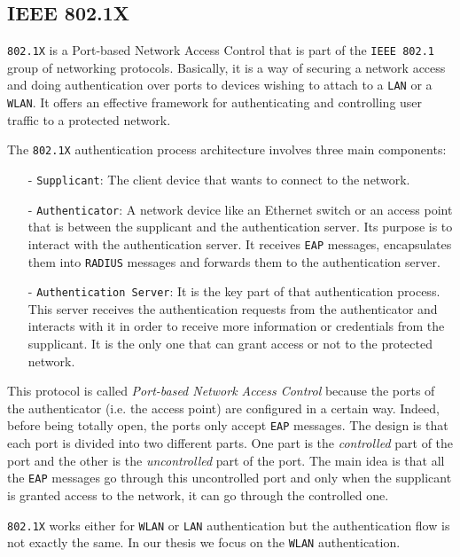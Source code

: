 \subsection{IEEE 802.1X}
\texttt{802.1X} is a Port-based Network Access Control that is part of the \texttt{IEEE 802.1} group of networking protocols. Basically, it is a way of securing a network access and doing authentication over ports to devices wishing to attach to a \texttt{LAN} or a \texttt{WLAN}. It offers an effective framework for authenticating and controlling user traffic to a protected network.

The \texttt{802.1X} authentication process architecture involves three main components:
\begin{itemize}
	\item[-]\texttt{Supplicant}: The client device that wants to connect to the network.
	\item[-]\texttt{Authenticator}: A network device like an Ethernet switch or an access point that is between the supplicant and the authentication server. Its purpose is to interact with the authentication server. It receives \texttt{EAP} messages, encapsulates them into \texttt{RADIUS} messages and forwards them to the authentication server.
	\item[-]\texttt{Authentication Server}: It is the key part of that authentication process. This server receives the authentication requests from the authenticator and interacts with it in order to receive more information or credentials from the supplicant. It is the only one that can grant access or not to the protected network.
\end{itemize} 

This protocol is called \textit{Port-based Network Access Control} because the ports of the authenticator (i.e. the access point) are configured in a certain way. Indeed, before being totally open, the ports only accept \texttt{EAP} messages. The design is that each port is divided into two different parts. One part is the \textit{controlled} part of the port and the other is the \textit{uncontrolled} part of the port. The main idea is that all the \texttt{EAP} messages go through this uncontrolled port and only when the supplicant is granted access to the network, it can go through the controlled one.

\texttt{802.1X} works either for \texttt{WLAN} or \texttt{LAN} authentication but the authentication flow is not exactly the same. In our thesis we focus on the \texttt{WLAN} authentication.


